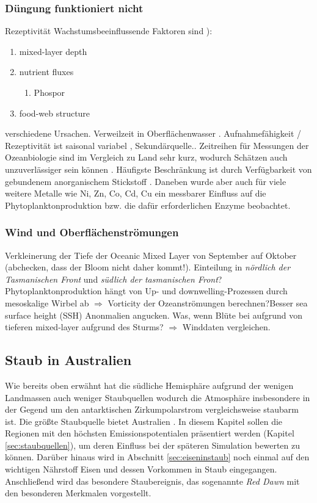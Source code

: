 \documentclass[12pt,a4paper,onecolumn]{scrartcl}
\begin{document}
\subsubsection{Düngung funktioniert nicht}
Rezeptivität \citep{Cropp.2013}
Wachstumsbeeinflussende Faktoren sind \citep{Falkowski.1998}):
\begin{enumerate}
\item mixed-layer depth
\item nutrient fluxes
\begin{enumerate}
\item Phospor \citep{REDFIELD.1960}
\end{enumerate}
\item food-web structure
\end{enumerate}
verschiedene Ursachen. Verweilzeit in Oberflächenwasser \citep{Hayes.2015}. Aufnahmefähigkeit / Rezeptivität ist saisonal variabel \citep{Gabric.2016}, Sekundärquelle.\citep{Falkowski.1998}. Zeitreihen für Messungen der Ozeanbiologie sind im Vergleich zu Land sehr kurz, wodurch Schätzen auch unzuverlässiger sein können \citep{Falkowski.1998}. Häufigste Beschränkung ist durch Verfügbarkeit von gebundenem anorganischem Stickstoff \citep{Falkowski.1998}. Daneben wurde aber auch für viele weitere Metalle wie Ni, Zn, Co, Cd, Cu ein messbarer Einfluss auf die Phytoplanktonproduktion bzw. die dafür erforderlichen Enzyme beobachtet.
\subsubsection{Wind und Oberflächenströmungen}
Verkleinerung der Tiefe der Oceanic Mixed Layer von September auf Oktober \citep{Tilburg.2002} (abchecken, dass der Bloom nicht daher kommt!). Einteilung in \textit{nördlich der Tasmanischen Front} und \textit{südlich der tasmanischen Front}? Phytoplanktonproduktion hängt von Up- und downwelling-Prozessen durch mesoskalige Wirbel ab \citep{Tilburg.2002} $\Rightarrow$ Vorticity der Ozeanströmungen berechnen?Besser sea surface height (SSH) Anonmalien angucken. Was, wenn Blüte bei \citet{Gabric.2016} aufgrund von tieferen mixed-layer aufgrund des Sturms? $\Rightarrow$ Winddaten vergleichen.
\subsection{Staub in Australien} \label{sec:Staub}
Wie bereits oben erwähnt hat die südliche Hemisphäre aufgrund der wenigen Landmassen auch weniger Staubquellen wodurch die Atmosphäre insbesondere in der Gegend um den antarktischen Zirkumpolarstrom vergleichsweise staubarm ist. Die größte Staubquelle bietet Australien \citep{Shao.2011}. In diesem Kapitel sollen die Regionen mit den höchsten Emissionspotentialen präsentiert werden (Kapitel \ref{sec:staubquellen}), um deren Einfluss bei der späteren Simulation bewerten zu können. Darüber hinaus wird in Abschnitt \ref{sec:eiseninstaub} noch einmal auf den wichtigen Nährstoff Eisen und dessen Vorkommen in Staub eingegangen. Anschließend wird das besondere Staubereignis, das sogenannte \textit{Red Dawn} mit den besonderen Merkmalen vorgestellt.
\end{document}
